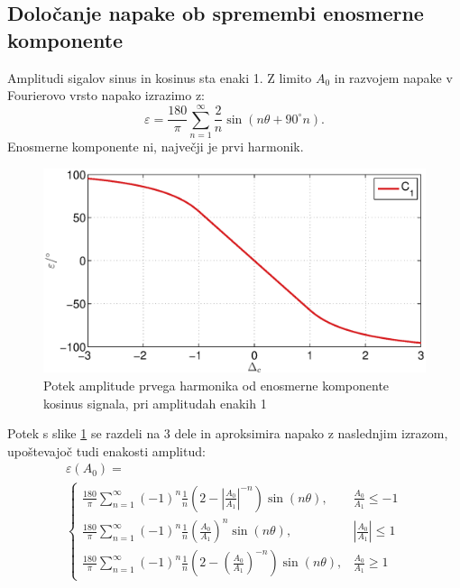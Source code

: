 \documentclass[a4paper]{article}
\begin{document}
\subsection{Določanje napake ob spremembi enosmerne komponente}
Amplitudi sigalov sinus in kosinus sta enaki 1.
Z limito $A_0$ in razvojem napake v Fourierovo vrsto napako izrazimo z:
\begin{equation}
\label{equ:off_lim_vrsta}
\varepsilon = \frac{180}{\pi}\sum_{n=1}^{\infty}\frac{2}{n} \sin (n \theta+ 90^\circ n).
\end{equation}
Enosmerne komponente ni,  največji je prvi harmonik.
\begin{figure}[!htb]
	\begin{center}
		\includegraphics[width=\linewidth]{./Slike/off.eps}
		\caption{Potek amplitude prvega harmonika od enosmerne komponente kosinus signala, pri amplitudah enakih 1} \label{fig:off}
	\end{center}
\end{figure}
Potek s slike \ref{fig:off} se razdeli na 3 dele in aproksimira napako z naslednjim izrazom, upoštevajoč tudi enakosti amplitud:
\begin{multline}
\label{equ:offc_err}
\varepsilon(A_0)=\\
\begin{cases}
\frac{180}{\pi}\sum_{n=1}^{\infty}(-1)^n\frac{1}{n}(2-|\frac{A_0}{A_1}|^{-n}) \sin (n \theta ), & \frac{A_0}{A_1}\leq -1 \\
\frac{180}{\pi}\sum_{n=1}^{\infty}(-1)^n\frac{1}{n}(\frac{A_0}{A_1})^n \sin (n \theta ), & |\frac{A_0}{A_1}|\leq 1 \\
\frac{180}{\pi}\sum_{n=1}^{\infty}(-1)^n\frac{1}{n}(2-(\frac{A_0}{A_1})^{-n}) \sin (n \theta ), & \frac{A_0}{A_1}\geq 1
\end{cases}
\end{multline}
\end{document}
